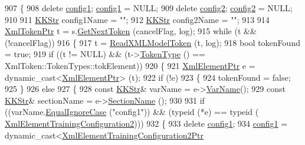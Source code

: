 \begin{DoxyCode}
907 \{
908   \textcolor{keyword}{delete}  \hyperlink{class_k_k_m_l_l_1_1_model_dual_a1d0f07c3ee783f1f91bcb5436c968908}{config1};  \hyperlink{class_k_k_m_l_l_1_1_model_dual_a1d0f07c3ee783f1f91bcb5436c968908}{config1} = NULL;
909   \textcolor{keyword}{delete}  \hyperlink{class_k_k_m_l_l_1_1_model_dual_ae3a785cf1484bb40abe8d090312e6061}{config2};  \hyperlink{class_k_k_m_l_l_1_1_model_dual_ae3a785cf1484bb40abe8d090312e6061}{config2} = NULL;
910 
911   \hyperlink{class_k_k_b_1_1_k_k_str}{KKStr}  config1Name = \textcolor{stringliteral}{""};
912   \hyperlink{class_k_k_b_1_1_k_k_str}{KKStr}  config2Name = \textcolor{stringliteral}{""};
913 
914   \hyperlink{class_k_k_b_1_1_xml_token}{XmlTokenPtr}  t = s.\hyperlink{class_k_k_b_1_1_xml_stream_a87cc738b05c666cf5d5c25beaab477b4}{GetNextToken} (cancelFlag, log);
915   \textcolor{keywordflow}{while}  (t  &&  (!cancelFlag))
916   \{
917     t = \hyperlink{class_k_k_m_l_l_1_1_model_a9feaeb8870d1f137b74586bb434b09d2}{ReadXMLModelToken} (t, log);
918     \textcolor{keywordtype}{bool} tokenFound = \textcolor{keyword}{true};
919     \textcolor{keywordflow}{if}  ((t != NULL)  &&  (t->\hyperlink{class_k_k_b_1_1_xml_token_ae98e2c1a798882647578cae4adcd7176}{TokenType} () == XmlToken::TokenTypes::tokElement))
920     \{
921       \hyperlink{class_k_k_b_1_1_xml_element}{XmlElementPtr} e = \textcolor{keyword}{dynamic\_cast<}\hyperlink{class_k_k_b_1_1_xml_element}{XmlElementPtr}\textcolor{keyword}{>} (t);
922       \textcolor{keywordflow}{if}  (!e)
923       \{
924         tokenFound = \textcolor{keyword}{false};
925       \}
926       \textcolor{keywordflow}{else}
927       \{
928         \textcolor{keyword}{const} \hyperlink{class_k_k_b_1_1_k_k_str}{KKStr}&  varName     = e->\hyperlink{class_k_k_b_1_1_xml_element_aef57cf00be66a3a387ce849b35125f51}{VarName}();
929         \textcolor{keyword}{const} \hyperlink{class_k_k_b_1_1_k_k_str}{KKStr}&  sectionName = e->\hyperlink{class_k_k_b_1_1_xml_element_a2b85dcb37a0f63bd7979d16d12296876}{SectionName} ();
930 
931         \textcolor{keywordflow}{if}  ((varName.\hyperlink{class_k_k_b_1_1_k_k_str_a562f9696417c53f66bc4088eac072ab5}{EqualIgnoreCase} (\textcolor{stringliteral}{"config1"}))  &&  (\textcolor{keyword}{typeid} (*e) == \textcolor{keyword}{typeid} (
      \hyperlink{namespace_k_k_m_l_l_a959ad458aebdb6b8716a6946c6d0f720}{XmlElementTrainingConfiguration2})))
932         \{
933           \textcolor{keyword}{delete} \hyperlink{class_k_k_m_l_l_1_1_model_dual_a1d0f07c3ee783f1f91bcb5436c968908}{config1};
934           \hyperlink{class_k_k_m_l_l_1_1_model_dual_a1d0f07c3ee783f1f91bcb5436c968908}{config1} = \textcolor{keyword}{dynamic\_cast<}\hyperlink{class_k_k_b_1_1_xml_element_template}{XmlElementTrainingConfiguration2Ptr}\textcolor{keyword}{
}
\end{DoxyCode}

